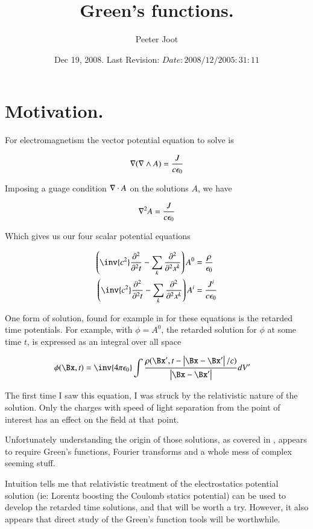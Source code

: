 \documentclass{article}
\title{ Green's functions. }
\author{Peeter Joot}
\date{ Dec 19, 2008.  Last Revision: $Date: 2008/12/20 05:31:11 $ }
\begin{document}
\maketitle{}
\tableofcontents

\section{ Motivation. }

For electromagnetism the vector potential equation to solve is

\begin{align*}
\nabla (\nabla \wedge A) = \frac{J}{c \epsilon_0}
\end{align*}

Imposing a guage condition $\nabla \cdot A$ on the solutions $A$, we have

\begin{align*}
\nabla^2 A = \frac{J}{c \epsilon_0}
\end{align*}

Which gives us our four scalar potential equations

\begin{align*}
\left(\inv{c^2}\PDsq{t}{} - \sum_k \PDsq{x^k}{} \right) A^0 &= \frac{\rho}{\epsilon_0} \\
\left(\inv{c^2}\PDsq{t}{} - \sum_k \PDsq{x^k}{} \right) A^i &= \frac{J^i}{c \epsilon_0} \\
\end{align*}

One form of solution, found for example in \cite{feynman1963flp}
for these equations is the retarded time potentials.  For example, with $\phi = A^0$, the retarded solution for $\phi$ at some time $t$, is expressed as an integral over all space

\begin{align*}
\phi(\Bx, t) &= \inv{4 \pi \epsilon_0} \int \frac{\rho(\Bx', t - \Abs{\Bx-\Bx'}/c)}{\Abs{\Bx - \Bx'}} dV'
\end{align*}

The first time I saw this equation, I was struck by the relativistic nature of the solution.  Only the charges with speed of light separation from the point of interest has an effect on the field at that point.

Unfortunately understanding the origin of those solutions, as covered in
\cite{ FitzRelEandM }, 
appears to require Green's functions, Fourier transforms and a whole mess
of complex seeming stuff.

Intuition tells me that relativistic treatment
of the electrostatics potential solution (ie: Lorentz boosting the Coulomb
statics potential) 
can be used to develop the 
retarded time solutions, and that will be worth a try.  However, it also
appears that direct study of the Green's
function tools will be worthwhile.
\end{document}

